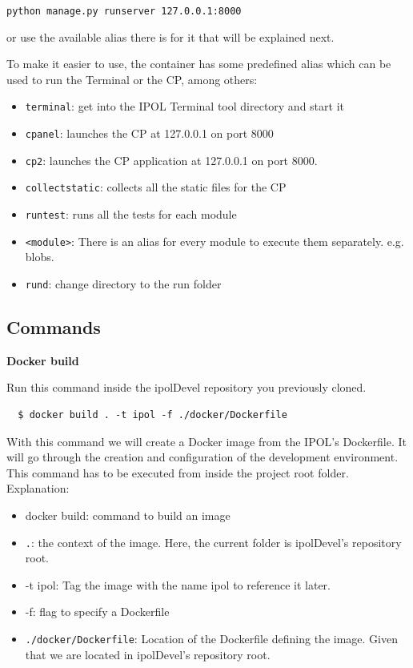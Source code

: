 \documentclass[a4paper,12pt]{article}
\begin{document}
{\tt python manage.py runserver 127.0.0.1:8000}

or use the available  alias there is for it that will be explained next.
 
To make it easier to use, the container has some predefined alias which can be used to run the Terminal or the CP, among others:
 \begin{itemize}
 	\item {\tt terminal}: get into the IPOL Terminal tool directory and start it
 	\item {\tt cpanel}: launches the CP at 127.0.0.1 on port 8000
 	\item {\tt cp2}: launches the CP application at 127.0.0.1 on port 8000.
 	\item {\tt collectstatic}: collects all the static files for the CP
 	\item {\tt runtest}: runs all the tests for each module
 	\item {\tt<module>}: There is an alias for every module to execute them separately. e.g. blobs.
 	\item {\tt rund}: change directory to the run folder
 \end{itemize}


\subsection{Commands}
\label{sec:docker_commands}

\textbf{Docker build}

Run this command inside the ipolDevel repository you previously cloned.

\begin{verbatim}
  $ docker build . -t ipol -f ./docker/Dockerfile
\end{verbatim}

With this command we will create a Docker image from the IPOL's Dockerfile. It will go through the creation and configuration of the development environment. This command has to be executed from inside the project root folder. Explanation:
\begin{itemize}
  \item docker build: command to build an image
  \item {\tt .}: the context of the image. Here, the current folder is ipolDevel's repository root.
  \item -t ipol: Tag the image with the name ipol to reference it later.
  \item -f: flag to specify a Dockerfile
  \item {\tt ./docker/Dockerfile}: Location of the Dockerfile defining the image. Given that we are located in ipolDevel's repository root.
\end{itemize}
\end{document}
